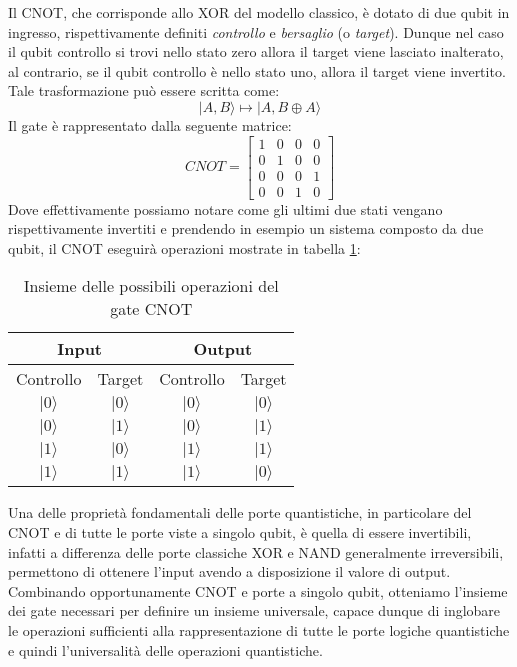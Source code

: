 Il CNOT, che corrisponde allo XOR del modello classico, è dotato di due qubit in ingresso, rispettivamente definiti \textit{controllo} e \textit{bersaglio} (o \textit{target}). Dunque nel caso il qubit controllo si trovi nello stato zero allora il target viene lasciato inalterato, al contrario, se il qubit controllo è nello stato uno, allora il target viene invertito. Tale trasformazione può essere scritta come:
\[
  | A, B \rangle \mapsto | A, B \oplus A \rangle
\]
Il gate è rappresentato dalla seguente matrice:
\[
  CNOT = 
  \begin{bmatrix}
    1 & 0 & 0 & 0 \\
    0 & 1 & 0 & 0 \\
    0 & 0 & 0 & 1 \\
    0 & 0 & 1 & 0
  \end{bmatrix}
\]
Dove effettivamente possiamo notare come gli ultimi due stati vengano rispettivamente invertiti e prendendo in esempio un sistema composto da due qubit, il CNOT eseguirà operazioni mostrate in tabella \ref{tab:cnot}:

\begin{table}[htbp]
  \centering
  \begin{tabular}{|cc|cc|}
  \hline
  \multicolumn{2}{|c|}{Input} & \multicolumn{2}{c|}{Output} \\ \hline
  \multicolumn{1}{|c|}{Controllo} & Target & \multicolumn{1}{c|}{Controllo} & Target \\ \hline
  \multicolumn{1}{|c|}{\(|0\rangle\)} & \(|0\rangle\) & \multicolumn{1}{c|}{\(|0\rangle\)} & \(|0\rangle\) \\ \hline
  \multicolumn{1}{|c|}{\(|0\rangle\)} & \(|1\rangle\) & \multicolumn{1}{c|}{\(|0\rangle\)} & \(|1\rangle\) \\ \hline
  \multicolumn{1}{|c|}{\(|1\rangle\)} & \(|0\rangle\) & \multicolumn{1}{c|}{\(|1\rangle\)} & \(|1\rangle\) \\ \hline
  \multicolumn{1}{|c|}{\(|1\rangle\)} & \(|1\rangle\) & \multicolumn{1}{c|}{\(|1\rangle\)} & \(|0\rangle\) \\ \hline
  \end{tabular}
  \caption{Insieme delle possibili operazioni del gate CNOT}
  \label{tab:cnot}
\end{table}

Una delle proprietà fondamentali delle porte quantistiche, in particolare del CNOT e di tutte le porte viste a singolo qubit, è quella di essere invertibili, infatti a differenza delle porte classiche XOR e NAND generalmente irreversibili, permettono di ottenere l'input avendo a disposizione il valore di output. Combinando opportunamente CNOT e porte a singolo qubit, otteniamo l'insieme dei gate necessari per definire un insieme universale, capace dunque di inglobare le operazioni sufficienti alla rappresentazione di tutte le porte logiche quantistiche e quindi l'universalità delle operazioni quantistiche.

